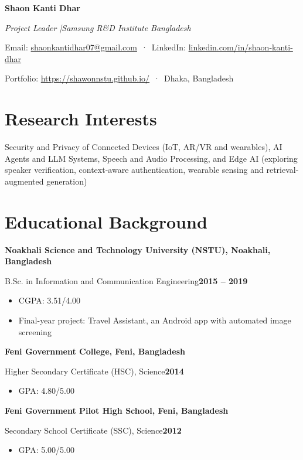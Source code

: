 \documentclass[10pt,letterpaper]{article}
\newcommand{\gap}{\vspace{3pt}}
\begin{document}
{\fontsize{24}{26}\selectfont\bfseries Shaon Kanti Dhar}\par\vspace{3pt}
{\itshape Project Leader \quad|\quad Samsung R\&D Institute Bangladesh}\par\vspace{3pt}
{\small Email: \href{mailto:shaonkantidhar07@gmail.com}{shaonkantidhar07@gmail.com} \,·\, LinkedIn: \href{https://www.linkedin.com/in/shaon-kanti-dhar}{linkedin.com/in/shaon-kanti-dhar}\par
Portfolio: \href{https://shawonnstu.github.io/}{https://shawonnstu.github.io/} \,·\, Dhaka, Bangladesh}\par

\section{Research Interests}
Security and Privacy of Connected Devices (IoT, AR/VR and wearables), AI Agents and LLM Systems, Speech and Audio Processing, and Edge AI (exploring speaker verification, context-aware authentication, wearable sensing and retrieval-augmented generation)

\section{Educational Background}
\textbf{Noakhali Science and Technology University (NSTU), Noakhali, Bangladesh}\par
B.Sc. in Information and Communication Engineering\hfill\textbf{2015 -- 2019}
\begin{itemize}
  \item CGPA: 3.51/4.00
  \item Final-year project: Travel Assistant, an Android app with automated image screening
\end{itemize}
\gap
\textbf{Feni Government College, Feni, Bangladesh}\par
Higher Secondary Certificate (HSC), Science\hfill\textbf{2014}
\begin{itemize}\item GPA: 4.80/5.00\end{itemize}
\gap
\textbf{Feni Government Pilot High School, Feni, Bangladesh}\par
Secondary School Certificate (SSC), Science\hfill\textbf{2012}
\begin{itemize}\item GPA: 5.00/5.00\end{itemize}
\end{document}

